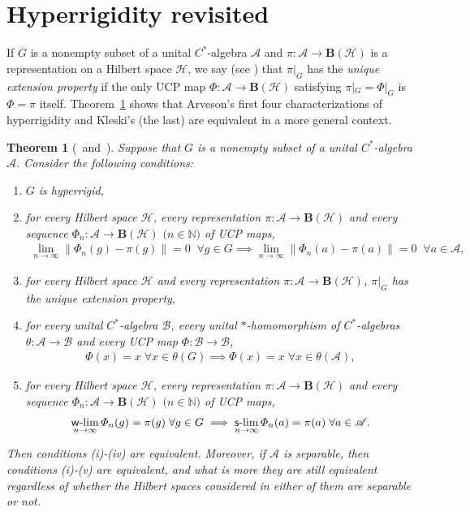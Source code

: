 \documentclass[reqno]{amsproc}
\numberwithin{equation}{section}
\newtheorem{theorem}{Theorem}[section]
\theoremstyle{remark}
\newcommand*{\ascr}{\mathscr{A}}
\newcommand*{\bscr}{\mathscr{B}}
\newcommand*{\hh}{\mathcal{H}}
\newcommand*{\natu}{\mathbb{N}}
\theoremstyle{definition}
\newcommand*{\ogr}{\boldsymbol{B}}
\def\sslim{\qopname\relax m{{\sf{s}\textrm-}lim}}
\def\wwlim{\qopname\relax m{{\sf{w}\textrm-}lim}}
\begin{document}
   \section{\label{App.B}Hyperrigidity revisited}
If $G$ is a nonempty subset of a unital $C^*$-algebra
$\ascr$ and $\pi\colon \ascr \to \ogr(\hh)$ is a
representation on a Hilbert space $\hh$, we say (see
\cite{Arv11}) that $\pi|_{ G}$ has the {\em unique
extension property} if the only UCP map $\varPhi\colon
\ascr \to \ogr(\hh)$ satisfying $\pi|_{G} =
\varPhi|_{G}$ is $\varPhi=\pi$ itself.
Theorem~\ref{murzeqiv} shows that Arveson's first four
characterizations of hyperrigidity and Kleski's (the
last) are equivalent in a more general context.
   \begin{theorem}[\mbox{\cite[Theorem~2.1]{Arv11} and
\cite[Proposition~2.2]{Kle14}}] \label{murzeqiv}
Suppose that $ G$ is a nonempty subset of a unital
$C^*$-algebra $\ascr$. Consider the following
conditions{\em :}
   \begin{enumerate}
   \item[(i)] $G$ is hyperrigid,
   \item[(ii)] for every Hilbert space $\hh$, every
representation $\pi\colon \ascr\to \ogr(\hh)$ and
every sequence $\varPhi_n\colon \ascr\to \ogr(\hh)$
$($$n\in \natu$$)$ of UCP maps,
   \begin{align*}
\lim_{n\to\infty}\|\varPhi_n(g)-\pi(g)\|=0 \;\;
\forall g\in G \implies
\lim_{n\to\infty}\|\varPhi_n(a)-\pi(a)\|=0 \;\;
\forall a\in \ascr,
   \end{align*}
   \item[(iii)] for every Hilbert space $\hh$ and every
representation $\pi\colon \ascr \to \ogr(\hh)$,
$\pi|_{ G}$ has the unique extension property,
   \item[(iv)] for every unital  $C^*$-algebra
$\bscr$, every unital $*$-homomorphism of
$C^*$-alge\-bras $\theta\colon \ascr \to \bscr$ and
every UCP map $\varPhi\colon \bscr \to \bscr$,
   \begin{align*}
\varPhi(x)=x \; \forall x \in \theta( G) \implies
\varPhi(x)=x \; \forall x \in \theta(\ascr),
   \end{align*}
   \item[(v)] for every Hilbert space $\hh$,
every representation $\pi\colon \ascr\to \ogr(\hh)$
and every sequence $\varPhi_n\colon \ascr\to
\ogr(\hh)$ $($$n\in \natu$$)$ of UCP maps,
   \begin{align*}
\wwlim_{n\to\infty}\varPhi_n(g)= \pi(g) \; \forall
g\in G \implies \sslim_{n\to\infty}\varPhi_n(a)=\pi(a)
\; \forall a\in \ascr.
   \end{align*}
   \end{enumerate}
Then conditions {\em (i)}-{\em (iv)} are equivalent.
Moreover, if $\ascr$ is separable, then conditions
{\em (i)}-{\em (v)} are equivalent, and what is more
they are still equivalent regardless of whether the
Hilbert spaces considered in either of them are
separable or not.
   \end{theorem}
\end{document}
